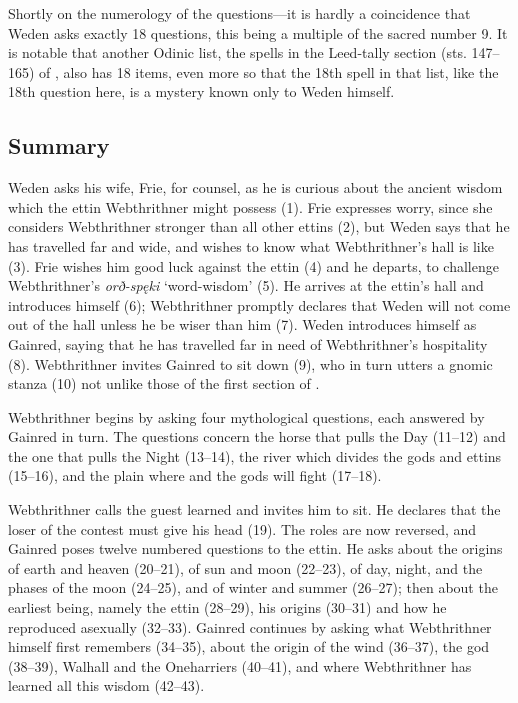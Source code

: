 Shortly on the numerology of the questions—it is hardly a coincidence that Weden asks exactly 18 questions, this being a multiple of the sacred number 9.  It is notable that another Odinic list, the spells in the Leed-tally section (sts. 147–165) of \Havamal, also has 18 items, even more so that the 18th spell in that list, like the 18th question here, is a mystery known only to Weden himself.

\subsection{Summary}

Weden asks his wife, Frie, for counsel, as he is curious about the ancient wisdom which the ettin Webthrithner might possess (1). Frie expresses worry, since she considers Webthrithner stronger than all other ettins (2), but Weden says that he has travelled far and wide, and wishes to know what Webthrithner’s hall is like (3).  Frie wishes him good luck against the ettin (4) and he departs, to challenge Webthrithner’s \emph{orð-spęki} ‘word-wisdom’ (5). He arrives at the ettin’s hall and introduces himself (6); Webthrithner promptly declares that Weden will not come out of the hall unless he be wiser than him (7).  Weden introduces himself as Gainred, saying that he has travelled far in need of Webthrithner’s hospitality (8).  Webthrithner invites Gainred to sit down (9), who in turn utters a gnomic stanza (10) not unlike those of the first section of \Havamal.

Webthrithner begins by asking four mythological questions, each answered by Gainred in turn. The questions concern the horse that pulls the Day (11–12) and the one that pulls the Night (13–14), the river which divides the gods and ettins (15–16), and the plain where  and the gods will fight (17–18).

Webthrithner calls the guest learned and invites him to sit.  He declares that the loser of the contest must give his head (19).  The roles are now reversed, and Gainred poses twelve numbered questions to the ettin.  He asks about the origins of earth and heaven (20–21), of sun and moon (22–23), of day, night, and the phases of the moon (24–25), and of winter and summer (26–27); then about the earliest being, namely the ettin  (28–29), his origins (30–31) and how he reproduced asexually (32–33). Gainred continues by asking what Webthrithner himself first remembers (34–35), about the origin of the wind (36–37), the god  (38–39), Walhall and the Oneharriers (40–41), and where Webthrithner has learned all this wisdom (42–43).

